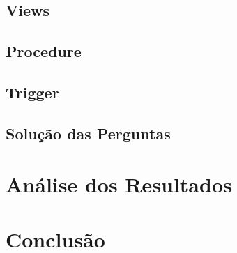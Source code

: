 \documentclass[12pt]{article}
\begin{document}
	\subsection{Views}
	\label{sec:views}
	
	\subsection{Procedure}
	\label{sec:procedure}
	
	\subsection{Trigger}
	\label{sec:trigger}
	
	\subsection{Solução das Perguntas}
	\label{sec:analisep}
	
	\section{Análise dos Resultados}
	\label{sec:resultados}
	
	\section{Conclusão}
	\label{sec:conclusao}
	
%
% 

	
\end{document}
